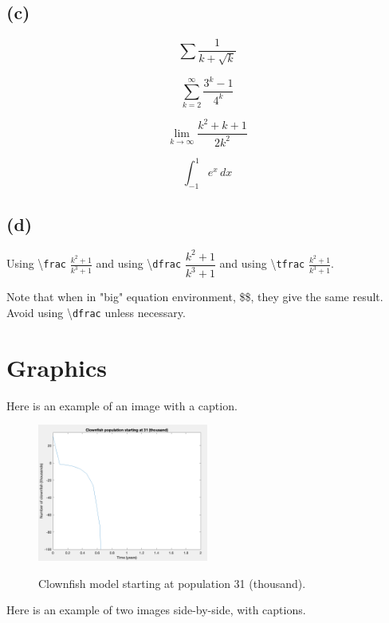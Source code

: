 \documentclass[11pt, a4paper]{article}
\begin{document}
\subsection{(c)} %

$$\sum \frac{1}{k+\sqrt{k}}$$

$$\sum\limits_{k=2}^\infty \frac{3^k-1}{4^k}$$

$$\lim_{k \to \infty} \frac{k^2 + k + 1}{2k^2}$$

$$\int_{-1}^{1} e^{x} \, dx$$

\subsection{(d)} %

Using \textbackslash \texttt{frac} $\frac{k^2+1}{k^3+1}$ and using \textbackslash \texttt{dfrac} $\dfrac{k^2+1}{k^3+1}$ and using \textbackslash \texttt{tfrac} $\tfrac{k^2+1}{k^3+1}$.

Note that when in "big" equation environment, \$\$, they give the same result. Avoid using \textbackslash \texttt{dfrac} unless necessary.
\newpage


\section{Graphics}

Here is an example of an image with a caption.

\begin{figure}[!h]
    \centering
    \includegraphics[width=0.5\textwidth]{images/clownfishplot1.png}
    \label{fig:f1}
    \caption{Clownfish model starting at population 31 (thousand).}
\end{figure}


Here is an example of two images side-by-side, with captions.
\end{document}
